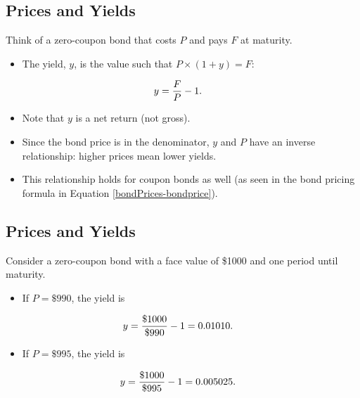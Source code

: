 \documentclass[letterpaper,10pt,english]{sphinxmanual}
\begin{document}
\subsection{Prices and Yields}
\label{bondPrices:id10}
Think of a zero-coupon bond that costs $P$ and pays $F$ at
maturity.
\begin{itemize}
\item {} 
The yield, $y$, is the value such that $P \times (1+y) = F$:

\end{itemize}
\begin{gather}
\begin{split}y & = \frac{F}{P} - 1.\end{split}\notag
\end{gather}\begin{itemize}
\item {} 
Note that $y$ is a net return (not gross).

\end{itemize}
\begin{itemize}
\item {} 
Since the bond price is in the denominator, $y$ and $P$
have an inverse relationship: higher prices mean lower yields.

\end{itemize}
\begin{itemize}
\item {} 
This relationship holds for coupon bonds as well (as seen in the
bond pricing formula in Equation \eqref{bondPrices-bondprice}).

\end{itemize}


\subsection{Prices and Yields}
\label{bondPrices:id11}
Consider a zero-coupon bond with a face value of \$1000 and one period
until maturity.
\begin{itemize}
\item {} 
If $P = \$990$, the yield is

\end{itemize}
\begin{gather}
\begin{split}y & = \frac{\$1000}{\$990} - 1 = 0.01010.\end{split}\notag
\end{gather}\begin{itemize}
\item {} 
If $P = \$995$, the yield is

\end{itemize}
\begin{gather}
\begin{split}y & = \frac{\$1000}{\$995} - 1 = 0.005025.\end{split}\notag
\end{gather}
\end{document}
